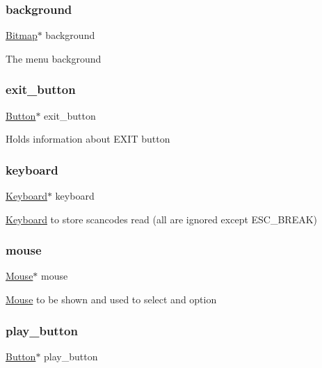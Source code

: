 \subsubsection{\texorpdfstring{background}{background}}
{\footnotesize\ttfamily \hyperlink{struct_bitmap}{Bitmap}$\ast$ background}

The menu background \hypertarget{struct_menu_a173a61ec5be315a84389cc08d3852abe}{}\label{struct_menu_a173a61ec5be315a84389cc08d3852abe} 
\subsubsection{\texorpdfstring{exit\+\_\+button}{exit\_button}}
{\footnotesize\ttfamily \hyperlink{struct_button}{Button}$\ast$ exit\+\_\+button}

Holds information about E\+X\+IT button \hypertarget{struct_menu_a945ceeb6236fbaf00dcdb7a0109f0d40}{}\label{struct_menu_a945ceeb6236fbaf00dcdb7a0109f0d40} 
\subsubsection{\texorpdfstring{keyboard}{keyboard}}
{\footnotesize\ttfamily \hyperlink{struct_keyboard}{Keyboard}$\ast$ keyboard}

\hyperlink{struct_keyboard}{Keyboard} to store scancodes read (all are ignored except E\+S\+C\+\_\+\+B\+R\+E\+AK) \hypertarget{struct_menu_a2514b83cbae6998a57eae74a24f6faf4}{}\label{struct_menu_a2514b83cbae6998a57eae74a24f6faf4} 
\subsubsection{\texorpdfstring{mouse}{mouse}}
{\footnotesize\ttfamily \hyperlink{struct_mouse}{Mouse}$\ast$ mouse}

\hyperlink{struct_mouse}{Mouse} to be shown and used to select and option \hypertarget{struct_menu_a17eeafa4c78aca8816c6aee85ce3a836}{}\label{struct_menu_a17eeafa4c78aca8816c6aee85ce3a836} 
\subsubsection{\texorpdfstring{play\+\_\+button}{play\_button}}
{\footnotesize\ttfamily \hyperlink{struct_button}{Button}$\ast$ play\+\_\+button}

